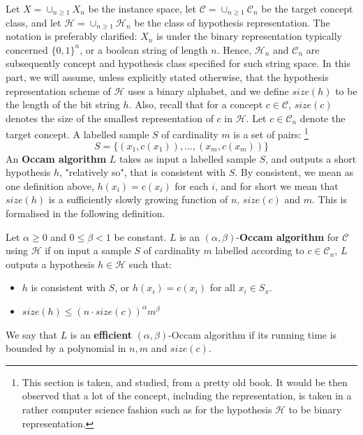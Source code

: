 Let $X= \cup_{n\geq 1} X_n$ be the instance space, let $\mathcal{C}=\cup_{n\geq 1}\mathcal{C}_{n}$ be the target concept class, and let $\mathcal{H}= \cup_{n\geq 1}\mathcal{H}_{n}$ be the class of hypothesis representation. The notation is preferably clarified: $X_{n}$ is under the binary representation typically concerned $\{0,1\}^{n}$, or a boolean string of length $n$. Hence, $\mathcal{H}_{n}$ and $\mathcal{C}_{n}$ are subsequently concept and hypothesis class specified for such string space. In this part, we will assume, unless explicitly stated otherwise, that the hypothesis representation scheme of $\mathcal{H}$ uses a binary alphabet, and we define $size(h)$ to be the length of the bit string $h$. Also, recall that for a concept $c\in \mathcal{C}$, $size(c)$ denotes the size of the smallest representation of $c$ in $\mathcal{H}$. Let $c\in \mathcal{C}_{n}$ denote the target concept. A labelled sample $S$ of cardinality $m$ is a set of pairs: \footnote{This section is taken, and studied, from a pretty old book. It would be then observed that a lot of the concept, including the representation, is taken in a rather computer science fashion such as for the hypothesis $\mathcal{H}$ to be binary representation.}
\begin{equation*}
    S = \{(x_1, c(x_1)),\dots,(x_m, c(x_m))\}
\end{equation*}
An \textbf{Occam algorithm} $L$ takes as input a labelled sample $S$, and outputs a short hypothesis $h$, "relatively so", that is consistent with $S$. By consistent, we mean as one definition above, $h(x_{i})= c(x_{i})$ for each $i$, and for short we mean that $size(h)$ is a sufficiently slowly growing function of $n$, $size(c)$ and $m$. This is formalised in the following definition. 

\begin{definition}
    Let $\alpha \geq 0$ and $0\leq \beta < 1$ be constant. $L$ is an $(\alpha, \beta)$-\textbf{Occam algorithm} for $\mathcal{C}$ using $\mathcal{H}$ if on input a sample $S$ of cardinality $m$ labelled according to $c\in \mathcal{C}_{n}$, $L$ outputs a hypothesis $h\in \mathcal{H}$ such that: 
    \begin{itemize}[itemsep=1pt,topsep=1pt]
        \item $h$ is consistent with $S$, or $h(x_{i})=c(x_i)$ for all $x_{i}\in S_{x}$. 
        \item $size(h)\leq (n\cdot size(c))^{\alpha}m^{\beta}$
    \end{itemize}
    We say that $L$ is an \textbf{efficient} $(\alpha,\beta)$-Occam algorithm if its running time is bounded by a polynomial in $n,m$ and $size(c)$.  
\end{definition}

